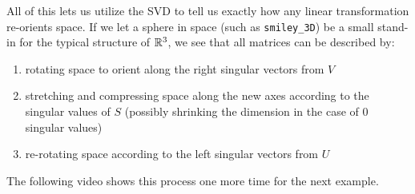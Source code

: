 \documentclass{ximera}
\begin{document}
All of this lets us utilize the SVD to tell us exactly how any linear transformation re-orients space. If we let a sphere in space (such as \texttt{smiley\_3D}) be a small stand-in for the typical structure of $\mathbb{R}^3$, we see that all matrices can be described by:

\begin{enumerate}

  \item rotating space to orient along the right singular vectors from $V$
  \item stretching and compressing space along the new axes according to the singular values of $S$ (possibly shrinking the dimension in the case of $0$ singular values)
  \item re-rotating space according to the left singular vectors from $U$

\end{enumerate}

The following video shows this process one more time for the next example.

\begin{center}
\end{center}
\end{document}
